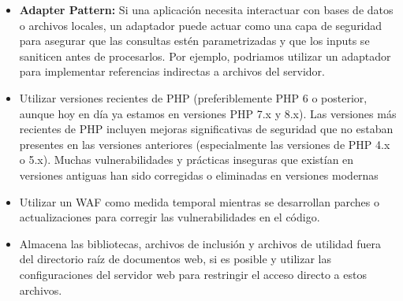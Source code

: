 \begin{itemize}
    \item \textbf{Adapter Pattern:} Si una aplicación necesita interactuar con bases de datos o archivos locales,  un adaptador puede actuar como una capa de seguridad para asegurar que las consultas estén parametrizadas y que los inputs se saniticen antes de procesarlos. Por ejemplo, podriamos utilizar un adaptador para implementar referencias indirectas a archivos del servidor. \\
  
    \item Utilizar versiones recientes de PHP (preferiblemente PHP 6 o posterior, aunque hoy en día ya estamos en versiones PHP 7.x y 8.x). Las versiones más recientes de PHP incluyen mejoras significativas de seguridad que no estaban presentes en las versiones anteriores (especialmente las versiones de PHP 4.x o 5.x). Muchas vulnerabilidades y prácticas inseguras que existían en versiones antiguas han sido corregidas o eliminadas en versiones modernas
    
    \item Utilizar un WAF como medida temporal mientras se desarrollan parches o actualizaciones para corregir las vulnerabilidades en el código.

    \item Almacena las bibliotecas, archivos de inclusión y archivos de utilidad fuera del directorio raíz de documentos web, si es posible y utilizar las configuraciones del servidor web para restringir el acceso directo a estos archivos.
\end{itemize}




